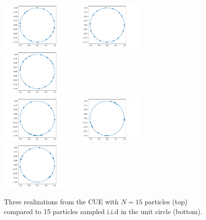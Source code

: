 \documentclass[twoside,11pt]{book}
\numberwithin{theorem}{chapter}
\numberwithin{definition}{chapter}
\numberwithin{proposition}{chapter}
\numberwithin{corollary}{chapter}
\numberwithin{example}{chapter}
\numberwithin{lemma}{chapter}
\begin{document}
\begin{figure}
\centering
\includegraphics[width= 0.32\textwidth]{img/circle/CUE_design_N_15_fig_1.pdf}~\includegraphics[width= 0.32\textwidth]{img/circle/CUE_design_N_15_fig_2.pdf}
~\includegraphics[width= 0.32\textwidth]{img/circle/CUE_design_N_15_fig_3.pdf}\\
\includegraphics[width= 0.32\textwidth]{img/circle/iid_design_N_15_fig_1.pdf}~\includegraphics[width= 0.32\textwidth]{img/circle/iid_design_N_15_fig_2.pdf}
~\includegraphics[width= 0.32\textwidth]{img/circle/iid_design_N_15_fig_3.pdf}\\
\caption{Three realizations from the CUE with $N = 15$ particles (top) compared to 15 particles sampled i.i.d in the unit circle (bottom). \label{fig:cue_vs_iid_particles}}
\end{figure}
 
\end{document}
